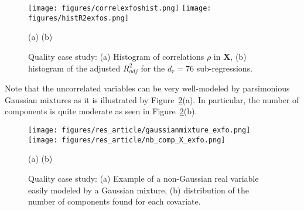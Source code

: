 \documentclass[12pt,a4paper]{report}
\begin{document}
\begin{figure}[h!]
\begin{center}
			\texttt{[image: figures/correlexfoshist.png]}
			\texttt{[image: figures/histR2exfos.png]}
\end{center}
\vspace{-5mm}
			\centerline{(a) \hspace{130px} (b)}
			\caption{Quality case study: (a) Histogram of correlations $\rho$ in $\boldsymbol{X}$, (b) histogram of the adjusted $R^2_{adj}$ for the $d_r=76$ sub-regressions.}\label{fig:graphCorr.quality}
\end{figure}  			
		
\vspace{3mm}

Note that the uncorrelated variables can be very well-modeled by parsimonious Gaussian mixtures as it is illustrated by Figure~\ref{fig:graphMixmod.quality}(a). In particular, the number of components is quite moderate as seen in Figure~\ref{fig:graphMixmod.quality}(b).
		
		\begin{figure}[h!]
\begin{center}
			\texttt{[image: figures/res\_article/gaussianmixture\_exfo.png]}
			\texttt{[image: figures/res\_article/nb\_comp\_X\_exfo.png]}
\end{center}
\vspace{-5mm}
			\centerline{(a) \hspace{130px} (b)}
			\caption{Quality case study: (a) Example of a non-Gaussian real variable easily modeled by a Gaussian mixture, (b) distribution of the number of components found for each covariate.}\label{fig:graphMixmod.quality}
\end{figure}  	
\end{document}
